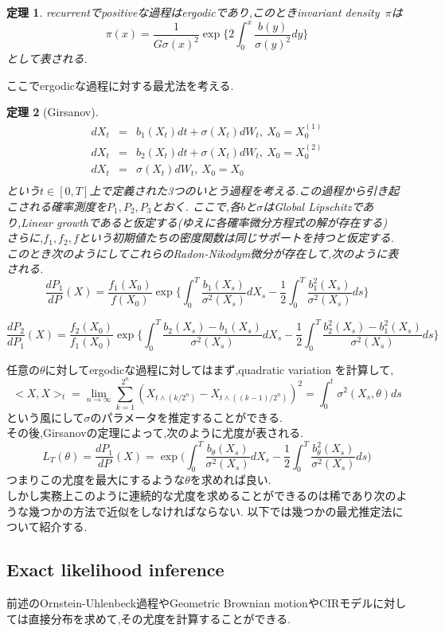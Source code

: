 \documentclass[a4paper,dvipdfmx]{jreport}
\numberwithin{equation}{section}
\newtheorem{Thm}     {定理}[section]
\renewenvironment{leftbar}{%
  \def\FrameCommand{\vrule width 1pt \hspace{10pt}}%
  \MakeFramed {\advance\hsize-\width \FrameRestore}}%
 {\endMakeFramed}
\def\thm{\begin{leftbar}\begin{Thm}}
\def\thmx{\end{Thm}\end{leftbar}}
\def\eqa{\begin{eqnarray}}
\def\eqax{\end{eqnarray}}
\begin{document}
\thm
recurrentでpositiveな過程はergodicであり,このときinvariant density\ $\pi$は
\[
\pi(x) = \frac{1}{G\sigma(x)^2} 
	\exp 
	\biggl\{ 
		2 \int_0^x \frac{b(y)}{\sigma(y)^2}dy 
	\biggl\}
\]
として表される.
\thmx
ここでergodicな過程に対する最尤法を考える.

\thm[Girsanov]
\eqa
dX_t &=& b_1(X_t) dt + \sigma(X_t) dW_t ,\ X_0 = X_0^{(1)} \\
dX_t &=& b_2(X_t) dt + \sigma(X_t) dW_t ,\ X_0 = X_0^{(2)} \\
dX_t &=& \sigma(X_t) dW_t ,\ X_0 = X_0\\
\eqax
という$t\in [0,T]$上で定義された3つのいとう過程を考える.この過程から引き起こされる確率測度を$P_1,P_2,P_3$とおく.
ここで,各$b$と$\sigma$はGlobal Lipschitzであり,Linear growthであると仮定する(ゆえに各確率微分方程式の解が存在する)\\
さらに,$f_1,f_2,f$という初期値たちの密度関数は同じサポートを持つと仮定する.\\
このとき次のようにしてこれらのRadon-Nikodym微分が存在して,次のように表される.
\[
\frac{dP_1}{dP}(X) = \frac{f_1(X_0)}{f(X_0)} 
\exp \biggl\{
	\int_0^T \frac{b_1(X_s)}{\sigma^2(X_s)} dX_s - 
	\frac{1}{2} \int_0^T \frac{ b_1^2(X_s) }{\sigma^2(X_s)} ds
	 \biggl\}
\]

\[
\frac{dP_2}{dP_1}(X) = \frac{f_2(X_0)}{f_1(X_0)} 
\exp \biggl\{
	\int_0^T \frac{b_2(X_s)-b_1(X_s)}{\sigma^2(X_s)} dX_s - 
	\frac{1}{2} \int_0^T \frac{b_2^2(X_s)- b_1^2(X_s) }{\sigma^2(X_s)} ds
	 \biggl\}
\]
	 

\thmx
任意の$\theta$に対してergodicな過程に対してはまず,quadratic variation を計算して,
\[
<X,X>_t = \lim_{n\to\infty} \sum_{k=1}^{2^n} (X_{t\wedge (k/2^n)} - X_{t\wedge ((k-1)/2^n)})^2 =
\int_0^t \sigma^2(X_s,\theta)ds 
\]
という風にして$\sigma$のパラメータを推定することができる.\\
その後,Girsanovの定理によって,次のように尤度が表される.
\[
L_T(\theta) = \frac{dP_1}{dP}(X)  
	= \exp \biggl( \int_0^T \frac{b_\theta(X_s)}{\sigma^2(X_s)} dX_s - 
	\frac{1}{2} \int_0^T \frac{ b_\theta^2(X_s) }{\sigma^2(X_s)} ds
	 \biggl)
\]
つまりこの尤度を最大にするような$\theta$を求めれば良い.\\
しかし実務上このように連続的な尤度を求めることができるのは稀であり次のような幾つかの方法で近似をしなければならない.
以下では幾つかの最尤推定法について紹介する.


\subsection{Exact likelihood inference}
前述のOrnstein-Uhlenbeck過程やGeometric Brownian motionやCIRモデルに対しては直接分布を求めて,その尤度を計算することができる.
\end{document}
